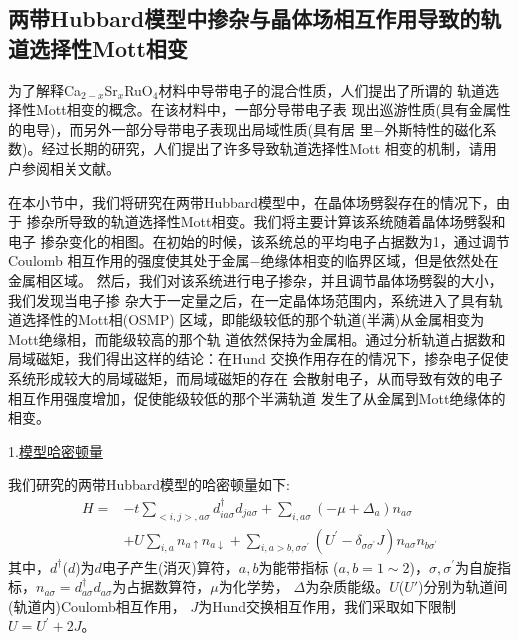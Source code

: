 \subsection{两带Hubbard模型中掺杂与晶体场相互作用导致的轨道选择性Mott相变}

为了解释Ca$_{2-x}$Sr$_x$RuO$_4$材料中导带电子的混合性质，人们提出了所谓的
轨道选择性Mott相变的概念\cite{anisimov:191}。在该材料中，一部分导带电子表
现出巡游性质(具有金属性的电导)，而另外一部分导带电子表现出局域性质(具有居
里$-$外斯特性的磁化系数)。经过长期的研究，人们提出了许多导致轨道选择性Mott
相变的机制\cite{koga:216402,koga:045128,medici:205124,ferrero:205126,
held:201102(R),knecht:081103(R),liebsch:226401,koga:359361,inaba:2393,
medici:126401,kita:195130,inaba:094712,jakobi:115109,werner:126405}，请用
户参阅相关文献。

在本小节中，我们将研究在两带Hubbard模型中，在晶体场劈裂存在的情况下，由于
掺杂所导致的轨道选择性Mott相变。我们将主要计算该系统随着晶体场劈裂和电子
掺杂变化的相图。在初始的时候，该系统总的平均电子占据数为1，通过调节Coulomb
相互作用的强度使其处于金属$-$绝缘体相变的临界区域，但是依然处在金属相区域。
然后，我们对该系统进行电子掺杂，并且调节晶体场劈裂的大小，我们发现当电子掺
杂大于一定量之后，在一定晶体场范围内，系统进入了具有轨道选择性的Mott相(OSMP)
区域，即能级较低的那个轨道(半满)从金属相变为Mott绝缘相，而能级较高的那个轨
道依然保持为金属相。通过分析轨道占据数和局域磁矩，我们得出这样的结论：在Hund
交换作用存在的情况下，掺杂电子促使系统形成较大的局域磁矩，而局域磁矩的存在
会散射电子，从而导致有效的电子相互作用强度增加，促使能级较低的那个半满轨道
发生了从金属到Mott绝缘体的相变。

1.\underline{模型哈密顿量}

我们研究的两带Hubbard模型的哈密顿量如下:
\begin{equation}
\label{eqn:model}
\begin{split}
H = &-t\sum_{<i,j>,a\sigma} d_{i a \sigma}^{\dagger} d_{j a \sigma} 
     +\sum_{i, a \sigma} (-\mu + \Delta_{a})n_{a \sigma} \\
    &+U\sum_{i,a} n_{a \uparrow} n_{a \downarrow} 
     +\sum_{i,a>b,\sigma \sigma^{\prime}}(U^\prime-\delta_{\sigma\sigma^\prime}J) 
      n_{a \sigma}n_{b \sigma^\prime}
\end{split}
\end{equation}
其中，$d^{\dagger}$($d$)为$d$电子产生(消灭)算符，$a,b$为能带指标
($a,b = 1 \sim 2$)，$\sigma,\sigma^{\prime}$为自旋指标，$n_{a \sigma} = 
d^{\dagger}_{a \sigma}d_{a \sigma}$为占据数算符，$\mu$为化学势，
$\Delta$为杂质能级。$U$($U'$)分别为轨道间(轨道内)Coulomb相互作用，
$J$为Hund交换相互作用，我们采取如下限制$U=U^{\prime}+2J$。

